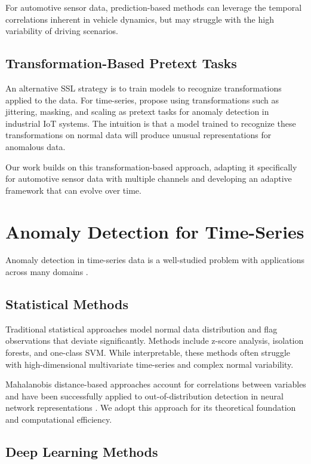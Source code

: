 For automotive sensor data, prediction-based methods can leverage the temporal correlations inherent in vehicle dynamics, but may struggle with the high variability of driving scenarios.

\subsection{Transformation-Based Pretext Tasks}

An alternative SSL strategy is to train models to recognize transformations applied to the data. For time-series, \textcite{tran2022self} propose using transformations such as jittering, masking, and scaling as pretext tasks for anomaly detection in industrial IoT systems. The intuition is that a model trained to recognize these transformations on normal data will produce unusual representations for anomalous data.

Our work builds on this transformation-based approach, adapting it specifically for automotive sensor data with multiple channels and developing an adaptive framework that can evolve over time.

\section{Anomaly Detection for Time-Series}

Anomaly detection in time-series data is a well-studied problem with applications across many domains \parencite{salehi2021unified}.

\subsection{Statistical Methods}

Traditional statistical approaches model normal data distribution and flag observations that deviate significantly. Methods include z-score analysis, isolation forests, and one-class SVM. While interpretable, these methods often struggle with high-dimensional multivariate time-series and complex normal variability.

Mahalanobis distance-based approaches \parencite{de2000mahalanobis} account for correlations between variables and have been successfully applied to out-of-distribution detection in neural network representations \parencite{lee2018simple}. We adopt this approach for its theoretical foundation and computational efficiency.

\subsection{Deep Learning Methods}

